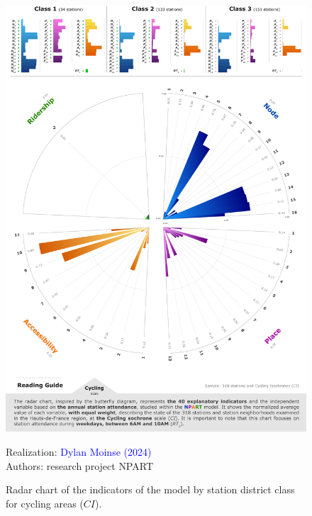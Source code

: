 \begin{refsegment}
    \begin{figure}[h!]\vspace*{4pt}
        \caption{Radar chart of the indicators of the model by station district class for cycling areas (\(CI\)).}
        \label{fig-chap6:radar-ci}
        \centerline{\includegraphics[width=1\columnwidth]{src/Figures/Chap-6/EN_NPART_Radar_CI.pdf}}
        \vspace{5pt}
        \begin{flushright}\scriptsize{
        Realization: \textcolor{blue}{Dylan Moinse (2024)}
        \\
        Authors: research project \acrshort{NPART}
        }\end{flushright}
    \end{figure}


\end{refsegment}
